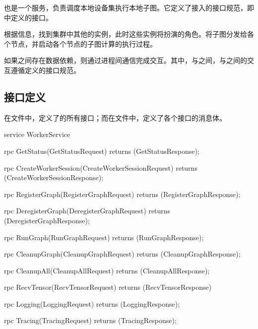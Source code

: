 \begin{content}

也是一个服务，负责调度本地设备集执行本地子图。它定义了接入的接口规范，即中定义的接口。

根据信息，找到集群中其他的实例，此时这些实例将扮演的角色。将子图分发给各个节点，并启动各个节点的子图计算的执行过程。

如果之间存在数据依赖，则通过进程间通信完成交互。其中，与之间，与之间的交互遵循定义的接口规范。

\subsection{接口定义}

在文件中，定义了的所有接口；而在文件中，定义了各个接口的消息体。

\begin{leftbar}
\begin{c++}
service WorkerService {
  rpc GetStatus(GetStatusRequest) 
      returns (GetStatusResponse);

  rpc CreateWorkerSession(CreateWorkerSessionRequest)
      returns (CreateWorkerSessionResponse);

  rpc RegisterGraph(RegisterGraphRequest) 
      returns (RegisterGraphResponse);

  rpc DeregisterGraph(DeregisterGraphRequest) 
      returns (DeregisterGraphResponse);

  rpc RunGraph(RunGraphRequest) 
      returns (RunGraphResponse);

  rpc CleanupGraph(CleanupGraphRequest) 
      returns (CleanupGraphResponse);

  rpc CleanupAll(CleanupAllRequest) 
      returns (CleanupAllResponse);

  rpc RecvTensor(RecvTensorRequest) 
      returns (RecvTensorResponse) {
  }

  rpc Logging(LoggingRequest) 
      returns (LoggingResponse);

  rpc Tracing(TracingRequest) 
      returns (TracingResponse);
}
\end{c++}
\end{leftbar}


\end{content}
